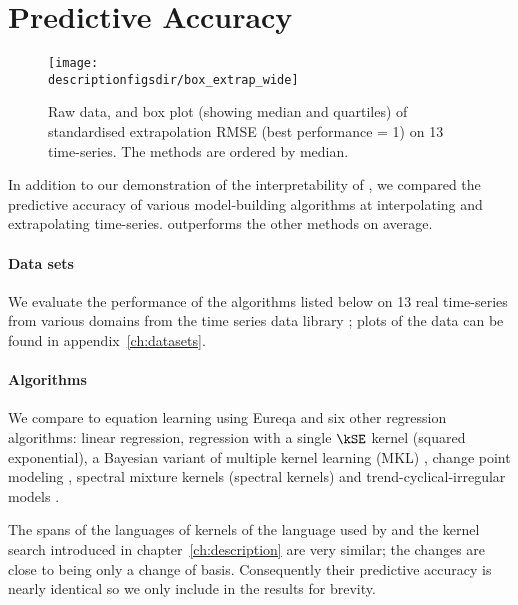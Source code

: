 \section{Predictive Accuracy}
\label{sec:numerical}

\begin{figure*}[ht]
\centering
\texttt{[image: \\descriptionfigsdir/box\_extrap\_wide]}
\vspace{-0.8cm}
\caption[RMSE comparison of \procedurename{} and other algorithms at extrapolation.]{
Raw data, and box plot (showing median and quartiles) of standardised extrapolation RMSE (best performance = 1) on 13 time-series.
The methods are ordered by median.
}
\label{fig:box_extrap_dist}
\end{figure*}

In addition to our demonstration of the interpretability of \procedurename{}, we compared the predictive accuracy of various model-building algorithms at interpolating and extrapolating time-series.
\procedurename{} outperforms the other methods on average.

\paragraph{Data sets}

We evaluate the performance of the algorithms listed below on 13 real time-series from various domains from the time series data library \citep{Hyndman_undated-zj}; plots of the data can be found in appendix~\ref{ch:datasets}.

\paragraph{Algorithms}

We compare \procedurename{} to equation learning using Eureqa \citep{Nutonian2011-el} and six other regression algorithms: linear regression, \gp{} regression with a single $\kSE$ kernel (squared exponential), a Bayesian variant of multiple kernel learning (MKL) \citep[e.g.][]{Bach2004-lb}, change point modeling \citep[e.g.][]{Garnett2010-rd, Saatci2010-el, Fox2012-fm}, spectral mixture kernels \citep{Wilson2013-eq} (spectral kernels) and trend-cyclical-irregular models \citep[e.g.][]{Lind2006-th}.

The spans of the languages of kernels of the language used by \procedurename{} and the kernel search introduced in chapter~\ref{ch:description} are very similar; the changes are close to being only a change of basis.
Consequently their predictive accuracy is nearly identical so we only include \procedurename{} in the results for brevity.


